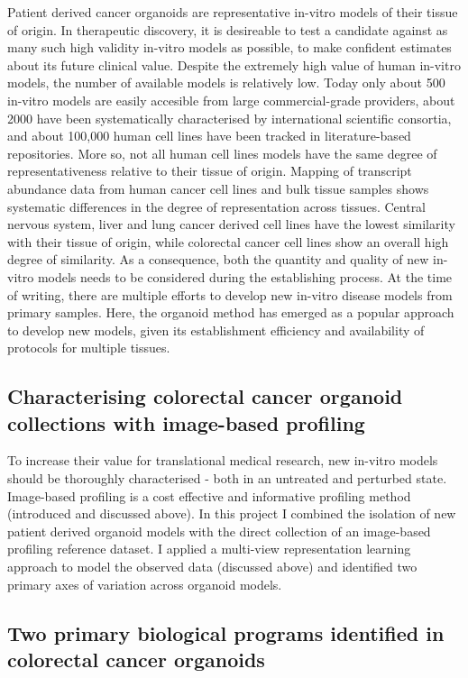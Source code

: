 \begin{flushleft}
Patient derived cancer organoids are representative in-vitro models of their tissue of origin. In therapeutic discovery, it is desireable to test a candidate against as many such high validity in-vitro models as possible, to make confident estimates about its future clinical value. Despite the extremely high value of human in-vitro models, the number of available models is relatively low. Today only about 500 in-vitro models are easily accesible from large commercial-grade providers, about 2000 have been systematically characterised by international scientific consortia, and about 100,000 human cell lines have been tracked in literature-based repositories. More so, not all human cell lines models have the same degree of representativeness relative to their tissue of origin. Mapping of transcript abundance data from human cancer cell lines and bulk tissue samples shows systematic differences in the degree of representation across tissues. Central nervous system, liver and lung cancer derived cell lines have the lowest similarity with their tissue of origin, while colorectal cancer cell lines show an overall high degree of similarity. As a consequence, both the quantity and quality of new in-vitro models needs to be considered during the establishing process. At the time of writing, there are multiple efforts to develop new in-vitro disease models from primary samples. Here, the organoid method has emerged as a popular approach to develop new models, given its establishment efficiency and availability of protocols for multiple tissues. 
\bigbreak

\subsection{Characterising colorectal cancer organoid collections with image-based profiling}

To increase their value for translational medical research, new in-vitro models should be thoroughly characterised - both in an untreated and perturbed state. Image-based profiling is a cost effective and informative profiling method (introduced and discussed above). In this project I combined the isolation of new patient derived organoid models with the direct collection of an image-based profiling reference dataset. I applied a multi-view representation learning approach to model the observed data (discussed above) and identified two primary axes of variation across organoid models. 
\bigbreak

\subsection{Two primary biological programs identified in colorectal cancer organoids}


\end{flushleft}
